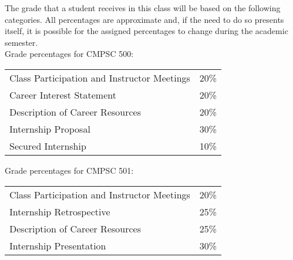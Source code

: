 % 
% 

The grade that a student receives in this class will be based on the following categories. All percentages are
approximate and, if the need to do so presents itself, it is possible for the assigned percentages to change during the
academic semester. \\

Grade percentages for CMPSC 500:
\begin{center}
\begin{tabular}{ll}
Class Participation and Instructor Meetings & 20\% \\
Career Interest Statement & 20\% \\
Description of Career Resources & 20\% \\
Internship Proposal & 30\% \\
Secured Internship & 10\% \\
\end{tabular}
\end{center}

\newpage
Grade percentages for CMPSC 501:

\vspace{-.1in}
\begin{center}
\begin{tabular}{ll}
Class Participation and Instructor Meetings & 20\% \\
Internship Retrospective & 25\% \\
Description of Career Resources & 25\% \\
Internship Presentation & 30\% \\
\end{tabular}
\end{center}

